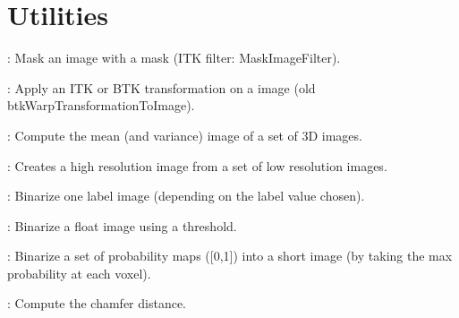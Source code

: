 \newpage
\section{Utilities}
\label{sec:utilities}

\begin{description}

\item[btkApplyMaskToImage]: Mask an image with a mask (ITK filter: MaskImageFilter).
\item[btkApplyTransformationToImage]: Apply an ITK or BTK transformation on a image (old btkWarpTransformationToImage).
\item[btkAverage3DImages]: Compute the mean (and variance) image of a set of 3D images.
\item[btkAverageImagesWithReference]: Creates a high resolution image from a set of low resolution images.
\item[btkBinarizeLabels]: Binarize one label image (depending on the label value chosen).
\item[btkBinarizeMask]: Binarize a float image using a threshold.
\item[btkBinarizeTissueProbabilityMaps]: Binarize a set of probability maps ([0,1]) into a short image (by taking the max probability at each voxel).
\item[btkComputeChamferDistance]: Compute the chamfer distance.

\end{description}
